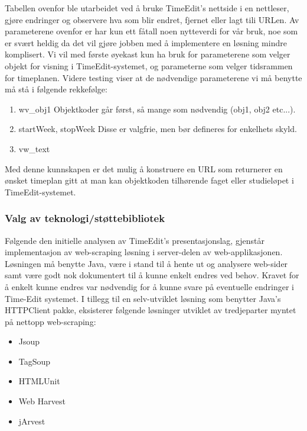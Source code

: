 \documentclass[../main.tex]{subfiles}
\begin{document}
Tabellen ovenfor ble utarbeidet ved å bruke TimeEdit's nettside i en nettleser, gjøre endringer og observere hva som blir endret, fjernet eller lagt tili URLen. Av parameterene ovenfor er har kun ett fåtall noen nytteverdi for vår bruk, noe som er svært heldig da det vil gjøre jobben med å implementere en løsning mindre komplisert. Vi vil med første øyekast kun ha bruk for parameterene som velger objekt for visning i TimeEdit-systemet, og parameterne som velger tidsrammen for timeplanen. Videre testing viser at de nødvendige parameterene vi må benytte må stå i følgende rekkefølge:

\begin{enumerate}
\item wv\_obj1
Objektkoder går først, så mange som nødvendig (obj1, obj2 etc...).
\item startWeek, stopWeek
Disse er valgfrie, men bør defineres for enkelhets skyld.
\item vw\_text
\end{enumerate}

Med denne kunnskapen er det mulig å konstruere en URL som returnerer en ønsket timeplan gitt at man kan objektkoden tilhørende faget eller studieløpet i TimeEdit-systemet. 

\subsubsection{Valg av teknologi/støttebibliotek}

Følgende den initielle analysen av TimeEdit’s presentasjonslag, gjenstår implementasjon av web-scraping løsning i server-delen av web-applikasjonen.  Løsningen må benytte Java, være i stand til å hente ut og analysere web-sider samt være godt nok dokumentert til å kunne enkelt endres ved behov. Kravet for å enkelt kunne endres var nødvendig for å kunne svare på eventuelle endringer i Time-Edit systemet.
I tillegg til en selv-utviklet løsning som benytter Java's HTTPClient pakke, eksisterer følgende løsninger utviklet av tredjeparter myntet på nettopp web-scraping:

\begin{itemize}
\item Jsoup 
\item TagSoup 
\item HTMLUnit 
\item Web Harvest 
\item jArvest 
\end{itemize}
\end{document}
